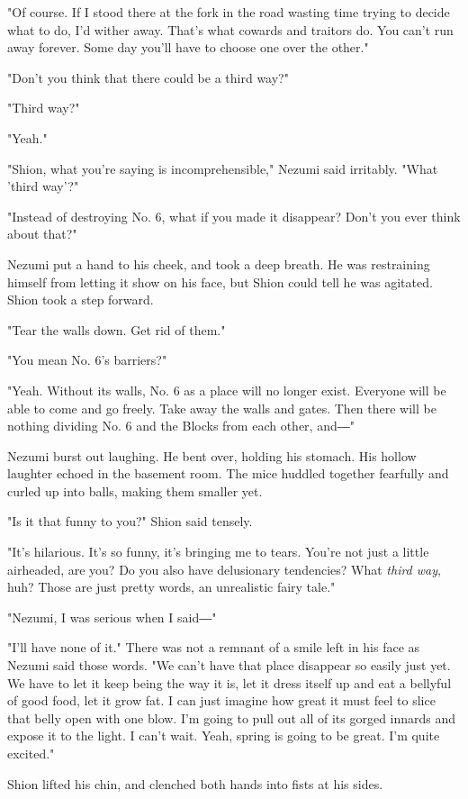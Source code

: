 "Of course. If I stood there at the fork in the road wasting time trying
to decide what to do, I'd wither away. That's what cowards and traitors
do. You can't run away forever. Some day you'll have to choose one over
the other."

"Don't you think that there could be a third way?"

"Third way?"

"Yeah."

"Shion, what you're saying is incomprehensible," Nezumi said irritably.
"What 'third way'?"

"Instead of destroying No. 6, what if you made it disappear? Don't you
ever think about that?"

Nezumi put a hand to his cheek, and took a deep breath. He was
restraining himself from letting it show on his face, but Shion could
tell he was agitated. Shion took a step forward.

"Tear the walls down. Get rid of them."

"You mean No. 6's barriers?"

"Yeah. Without its walls, No. 6 as a place will no longer exist.
Everyone will be able to come and go freely. Take away the walls and
gates. Then there will be nothing dividing No. 6 and the Blocks from
each other, and―"

Nezumi burst out laughing. He bent over, holding his stomach. His hollow
laughter echoed in the basement room. The mice huddled together
fearfully and curled up into balls, making them smaller yet.

"Is it that funny to you?" Shion said tensely.

"It's hilarious. It's so funny, it's bringing me to tears. You're not
just a little airheaded, are you? Do you also have delusionary
tendencies? What \emph{third way}, huh? Those are just pretty words, an
unrealistic fairy tale."

"Nezumi, I was serious when I said―"

"I'll have none of it." There was not a remnant of a smile left in his
face as Nezumi said those words. "We can't have that place disappear so
easily just yet. We have to let it keep being the way it is, let it
dress itself up and eat a bellyful of good food, let it grow fat. I can
just imagine how great it must feel to slice that belly open with one
blow. I'm going to pull out all of its gorged innards and expose it to
the light. I can't wait. Yeah, spring is going to be great. I'm quite
excited."

Shion lifted his chin, and clenched both hands into fists at his sides.

